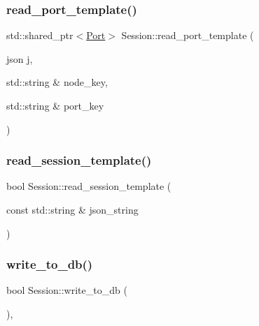 \mbox{\label{class_session_a092e487a152de25de0a37ef16356da7c}} 
\subsubsection{\texorpdfstring{read\+\_\+port\+\_\+template()}{read\_port\_template()}}
{\footnotesize\ttfamily std\+::shared\+\_\+ptr$<$\hyperlink{class_port}{Port}$>$ Session\+::read\+\_\+port\+\_\+template (\begin{DoxyParamCaption}\item[{json}]{j,  }\item[{std\+::string \&}]{node\+\_\+key,  }\item[{std\+::string \&}]{port\+\_\+key }\end{DoxyParamCaption})}

\mbox{\label{class_session_adb03e68fc271cf09c0175cb908b4afff}} 
\subsubsection{\texorpdfstring{read\+\_\+session\+\_\+template()}{read\_session\_template()}}
{\footnotesize\ttfamily bool Session\+::read\+\_\+session\+\_\+template (\begin{DoxyParamCaption}\item[{const std\+::string \&}]{json\+\_\+string }\end{DoxyParamCaption})}

\mbox{\label{class_session_a513e5436b4c990985300246bb39d9f5c}} 
\subsubsection{\texorpdfstring{write\+\_\+to\+\_\+db()}{write\_to\_db()}}
{\footnotesize\ttfamily bool Session\+::write\+\_\+to\+\_\+db (\begin{DoxyParamCaption}{ }\end{DoxyParamCaption})\hspace{0.3cm}{\ttfamily [final]}, {\ttfamily [virtual]}}



